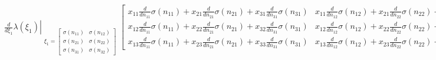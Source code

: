 \documentclass[11pt]{article}
\begin{document}
    
    $\displaystyle \left. \frac{d}{d \xi_{1}} \lambda{\left(\xi_{1} \right)} \right|_{\substack{ \xi_{1}=\left[\begin{matrix}\sigma{\left(n_{11} \right)} & \sigma{\left(n_{12} \right)}\\\sigma{\left(n_{21} \right)} & \sigma{\left(n_{22} \right)}\\\sigma{\left(n_{31} \right)} & \sigma{\left(n_{32} \right)}\end{matrix}\right] }} \left[\begin{matrix}x_{11} \frac{d}{d n_{11}} \sigma{\left(n_{11} \right)} + x_{21} \frac{d}{d n_{21}} \sigma{\left(n_{21} \right)} + x_{31} \frac{d}{d n_{31}} \sigma{\left(n_{31} \right)} & x_{11} \frac{d}{d n_{12}} \sigma{\left(n_{12} \right)} + x_{21} \frac{d}{d n_{22}} \sigma{\left(n_{22} \right)} + x_{31} \frac{d}{d n_{32}} \sigma{\left(n_{32} \right)}\\x_{12} \frac{d}{d n_{11}} \sigma{\left(n_{11} \right)} + x_{22} \frac{d}{d n_{21}} \sigma{\left(n_{21} \right)} + x_{32} \frac{d}{d n_{31}} \sigma{\left(n_{31} \right)} & x_{12} \frac{d}{d n_{12}} \sigma{\left(n_{12} \right)} + x_{22} \frac{d}{d n_{22}} \sigma{\left(n_{22} \right)} + x_{32} \frac{d}{d n_{32}} \sigma{\left(n_{32} \right)}\\x_{13} \frac{d}{d n_{11}} \sigma{\left(n_{11} \right)} + x_{23} \frac{d}{d n_{21}} \sigma{\left(n_{21} \right)} + x_{33} \frac{d}{d n_{31}} \sigma{\left(n_{31} \right)} & x_{13} \frac{d}{d n_{12}} \sigma{\left(n_{12} \right)} + x_{23} \frac{d}{d n_{22}} \sigma{\left(n_{22} \right)} + x_{33} \frac{d}{d n_{32}} \sigma{\left(n_{32} \right)}\end{matrix}\right]$
\end{document}
